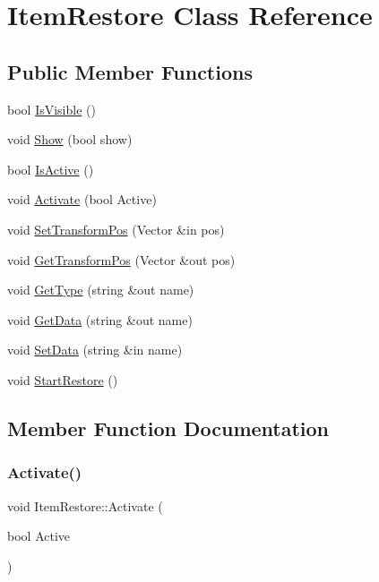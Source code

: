 \hypertarget{class_item_restore}{}\section{Item\+Restore Class Reference}
\label{class_item_restore}
\subsection*{Public Member Functions}
\begin{DoxyCompactItemize}
\item 
bool \hyperlink{class_item_restore_a101320992983faad9c2661738e11ffd8}{Is\+Visible} ()
\item 
void \hyperlink{class_item_restore_a7681e3e167a259eb4e11e02bc477d5ea}{Show} (bool show)
\item 
bool \hyperlink{class_item_restore_a4e85d53e9f8026b9ad91fd0a42b59464}{Is\+Active} ()
\item 
void \hyperlink{class_item_restore_a0b6ccbdaac18fe34e0e5570dd8388b33}{Activate} (bool Active)
\item 
void \hyperlink{class_item_restore_a03255a66844289e3d8d94d69ffb56c23}{Set\+Transform\+Pos} (Vector \&in pos)
\item 
void \hyperlink{class_item_restore_a9e5489ca1ea60e13bcf62385bc6df782}{Get\+Transform\+Pos} (Vector \&out pos)
\item 
void \hyperlink{class_item_restore_a7adf97306013f8ed34a91d9f5f152ea5}{Get\+Type} (string \&out name)
\item 
void \hyperlink{class_item_restore_a27c36113481bf5a46c506b23993f3bc2}{Get\+Data} (string \&out name)
\item 
void \hyperlink{class_item_restore_a467e238a37299c89726bfb3f6520952b}{Set\+Data} (string \&in name)
\item 
void \hyperlink{class_item_restore_aa47f7ced936cbf52586d9476cecbc6cd}{Start\+Restore} ()
\end{DoxyCompactItemize}


\subsection{Member Function Documentation}
\hypertarget{class_item_restore_a0b6ccbdaac18fe34e0e5570dd8388b33}{}\label{class_item_restore_a0b6ccbdaac18fe34e0e5570dd8388b33} 
\subsubsection{\texorpdfstring{Activate()}{Activate()}}
{\footnotesize\ttfamily void Item\+Restore\+::\+Activate (\begin{DoxyParamCaption}\item[{bool}]{Active }\end{DoxyParamCaption})}

